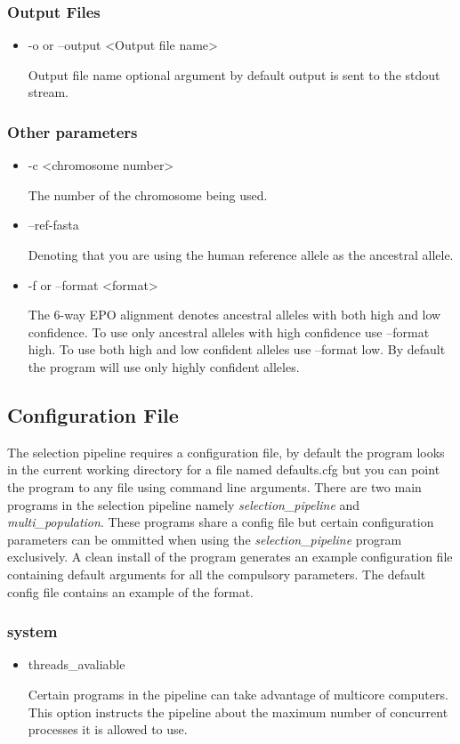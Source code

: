\documentclass[a4paper,10pt]{article}
\begin{document}
\subsubsection{Output Files}
\begin{itemize}
\item -o or --output <Output file name>

Output file name optional argument by default output is sent to the stdout stream.
\end{itemize}
\subsubsection{Other parameters}
\begin{itemize}
\item -c <chromosome number>

The number of the chromosome being used.

\item --ref-fasta

Denoting that you are using the human reference allele as the ancestral allele. 
\item -f or --format <format>

The 6-way EPO alignment denotes ancestral alleles with both high and low confidence. To use only ancestral alleles with high confidence use --format high. To use both high and low confident alleles use --format low. By default the program will use only highly confident alleles.
\end{itemize}
\subsection{Configuration File}
The selection pipeline requires a configuration file, by default the program looks in the current working directory for a file named defaults.cfg but you can point the program to any file using command line arguments. There are two main programs in the selection pipeline namely \emph{selection\_pipeline} and \emph{multi\_population}. These programs share a config file but certain configuration parameters can be ommitted when using the \emph{selection\_pipeline} program exclusively. A clean install of the program generates an example configuration file containing default arguments for all the compulsory parameters. The default config file contains an example of the format.
\subsubsection{system}
\begin{itemize}
\item threads\_avaliable

Certain programs in the pipeline can take advantage of multicore computers. This option instructs the pipeline about the maximum number of concurrent processes it is allowed to use.
\end{itemize}
\end{document}
